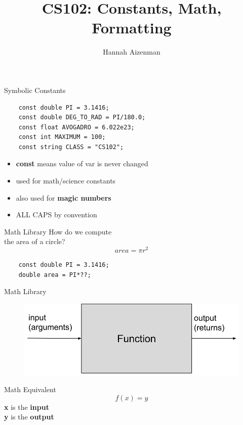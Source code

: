 \documentclass[xcolor={dvipsnames}]{beamer}
\begin{document}
\title{ CS102: Constants, Math, Formatting}
\author{Hannah Aizenman}

\begin{frame}
	\titlepage
\end{frame}

\begin{frame}[fragile]{Symbolic Constants}
\center
\begin{verbatim}
	const double PI = 3.1416;
	const double DEG_TO_RAD = PI/180.0;
	const float AVOGADRO = 6.022e23;
	const int MAXIMUM = 100;
	const string CLASS = "CS102";
\end{verbatim}

\begin{block}{}
	\begin{itemize}
		\item \textbf{const} means value of var is never changed
		\item used for math/science constants
		\item also used for \textbf{magic numbers}
		\item ALL CAPS by convention
	\end{itemize}
\end{block}
\end{frame}

\begin{frame}[fragile]{Math Library}
	\center
	\huge How do we compute \\the area of a circle? 
	\pause
	\begin{equation*}
	area = \pi r^2
	\end{equation*}
	\pause
	\begin{verbatim}
	const double PI = 3.1416;
	double area = PI*??;
	\end{verbatim}
\end{frame}



\begin{frame}{Math Library}
\begin{figure}
	\includegraphics[width=1\textwidth]{function}
\end{figure}
\pause
\begin{block}{Math Equivalent}
\begin{equation*}
	f(x) = y
\end{equation*}
\center
\textbf{x} is the \textbf{input}\\
\textbf{y} is the \textbf{output}
\end{block}
\end{frame}
\end{document}
